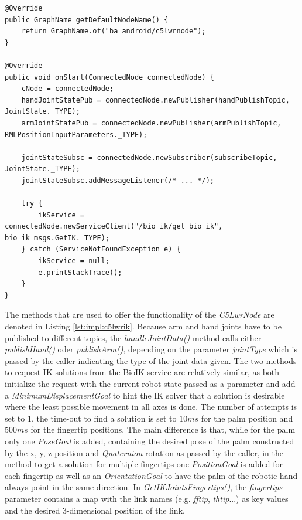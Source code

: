 \begin{lstlisting}[caption={Startup of the C5LwrNode}, label=lst:impl:c5lwrnode]
@Override
public GraphName getDefaultNodeName() {
	return GraphName.of("ba_android/c5lwrnode");
}

@Override
public void onStart(ConnectedNode connectedNode) {
	cNode = connectedNode;
	handJointStatePub = connectedNode.newPublisher(handPublishTopic, JointState._TYPE);
	armJointStatePub = connectedNode.newPublisher(armPublishTopic, RMLPositionInputParameters._TYPE);

	jointStateSubsc = connectedNode.newSubscriber(subscribeTopic, JointState._TYPE);
	jointStateSubsc.addMessageListener(/* ... */);

	try {
		ikService = connectedNode.newServiceClient("/bio_ik/get_bio_ik", bio_ik_msgs.GetIK._TYPE);
	} catch (ServiceNotFoundException e) {
		ikService = null;
		e.printStackTrace();
	}
}
\end{lstlisting}

The methods that are used to offer the functionality of the \textit{C5LwrNode} are denoted in Listing \ref{lst:impl:c5lwrik}. Because arm and hand joints have to be published to different topics, the \textit{handleJointData()} method calls either \textit{publishHand()} oder \textit{publishArm()}, depending on the parameter \textit{jointType} which is passed by the caller indicating the type of the joint data given. The two methods to request IK solutions from the BioIK service are relatively similar, as both initialize the request with the current robot state passed as a parameter and add a \textit{MinimumDisplacementGoal} to hint the IK solver that a solution is desirable where the least possible movement in all axes is done. The number of attempts is set to $1$, the time-out to find a solution is set to $10ms$ for the palm position and $500ms$ for the fingertip positions. The main difference is that, while for the palm only one \textit{PoseGoal} is added, containing the desired pose of the palm constructed by the x, y, z position and \textit{Quaternion} rotation as passed by the caller, in the method to get a solution for multiple fingertips one \textit{PositionGoal} is added for each fingertip as well as an \textit{OrientationGoal} to have the palm of the robotic hand always point in the same direction. In \textit{GetIKJointsFingertips()}, the \textit{fingertips} parameter contains a map with the link names (e.g. \textit{fftip}, \textit{thtip}...) as key values and the desired 3-dimensional position of the link.

